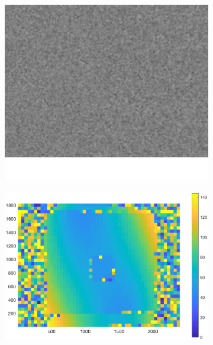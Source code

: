 \begin{figure}[h!]
\begin{subfigure}[t]{0.18\linewidth}
	\end{subfigure}
	\begin{subfigure}[t]{0.18\linewidth}
		\centering
		\includegraphics[width=0.8\linewidth]{figures/part2/test_right_3}
	\end{subfigure}
	\begin{subfigure}[t]{0.20\linewidth}
		\centering
		\includegraphics[width=1\linewidth]{figures/part2/test3_cmp}
	\end{subfigure}
	\begin{subfigure}[t]{0.20\linewidth}
		\centering

\end{subfigure}
\end{figure}
